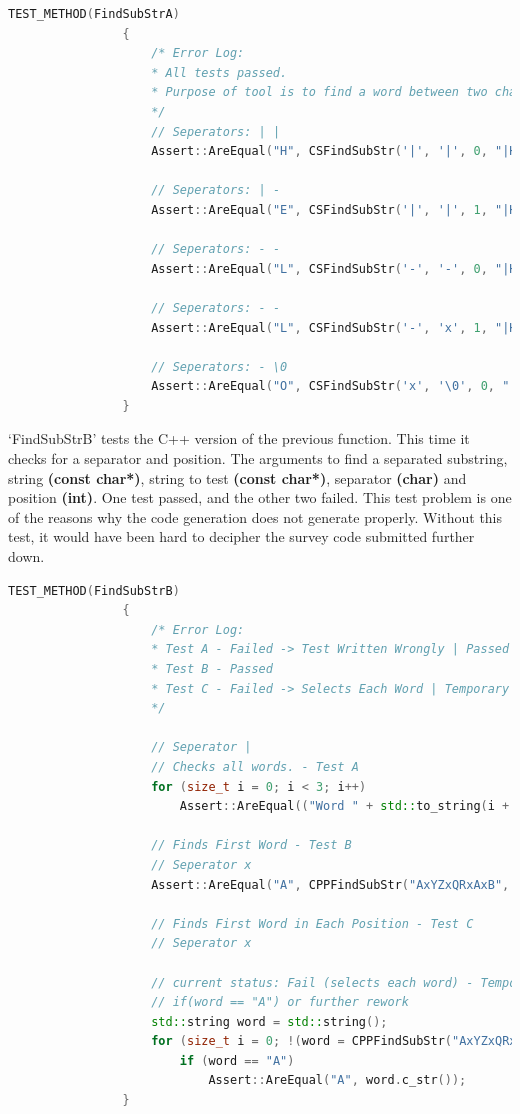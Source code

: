 \documentclass[12pt]{report} %
\begin{document}
			\begin{lstlisting}[language=c++]
				TEST_METHOD(FindSubStrA)
				{
					/* Error Log:
					* All tests passed.
					* Purpose of tool is to find a word between two characters.
					*/
					// Seperators: | |
					Assert::AreEqual("H", CSFindSubStr('|', '|', 0, "|H|E-L-LxO").c_str());

					// Seperators: | -
					Assert::AreEqual("E", CSFindSubStr('|', '|', 1, "|H|E|L-LxO").c_str());

					// Seperators: - -
					Assert::AreEqual("L", CSFindSubStr('-', '-', 0, "|H|E-L-LxO").c_str());

					// Seperators: - -
					Assert::AreEqual("L", CSFindSubStr('-', 'x', 1, "|H|E-L-LxO").c_str());

					// Seperators: - \0
					Assert::AreEqual("O", CSFindSubStr('x', '\0', 0, "|H|E-L-LxO").c_str());
				}
			\end{lstlisting}

			`FindSubStrB' tests the C++ version of the previous function. This time it checks for a separator and position. The arguments to find a separated substring, string \textbf{(const char*)}, string to test \textbf{(const char*)}, separator \textbf{(char)} and position \textbf{(int)}. One test passed, and the other two failed. This test problem is one of the reasons why the code generation does not generate properly. Without this test, it would have been hard to decipher the survey code submitted further down.

			\begin{lstlisting}[language=c++]
				TEST_METHOD(FindSubStrB)
				{
					/* Error Log:
					* Test A - Failed -> Test Written Wrongly | Passed
					* Test B - Passed
					* Test C - Failed -> Selects Each Word | Temporary Solution: Read Below.
					*/

					// Seperator |
					// Checks all words. - Test A
					for (size_t i = 0; i < 3; i++)
						Assert::AreEqual(("Word " + std::to_string(i + 1)).c_str(), CPPFindSubStr("Word 1|Word 2|Word 3", "Word", '|', i).c_str());

					// Finds First Word - Test B
					// Seperator x
					Assert::AreEqual("A", CPPFindSubStr("AxYZxQRxAxB", "A", 'x', 0).c_str());

					// Finds First Word in Each Position - Test C
					// Seperator x

					// current status: Fail (selects each word) - Temporary solution:
					// if(word == "A") or further rework
					std::string word = std::string();
					for (size_t i = 0; !(word = CPPFindSubStr("AxYZxQRxAxB", "A", 'x', (int)i)).empty(); i++)
						if (word == "A")
							Assert::AreEqual("A", word.c_str());
				}
			\end{lstlisting}
\end{document}
